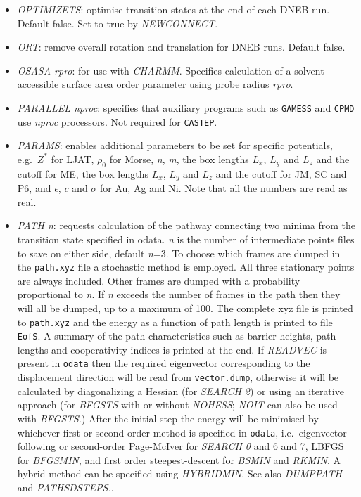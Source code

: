 \documentclass[12pt,a4paper,dvips]{article}
\begin{document}
\begin{itemize}
\item {\it OPTIMIZETS\/}: optimise transition states at the end of each DNEB run.
Default false. Set to true by {\it NEWCONNECT\/}.

\item {\it ORT\/}: remove overall rotation and translation for DNEB runs. Default false.

\item {\it OSASA rpro\/}: for use with {\it CHARMM\/}. Specifies calculation of
a solvent accessible surface area order parameter using probe radius {\it rpro\/}.

\item {\it PARALLEL nproc\/}: specifies that auxiliary programs such as {\tt GAMESS} and
{\tt CPMD} use {\it nproc\/} processors. Not required for {\tt CASTEP}.

\item {\it PARAMS\/}: enables additional parameters to be set for
specific potentials, e.g.~$Z^*$ for LJAT, $\rho_0$ for Morse, {\it n\/}, {\it m\/}, the
box lengths $L_x$, $L_y$ and $L_z$ and the cutoff for ME, the
box lengths $L_x$, $L_y$ and $L_z$ and the cutoff for JM, SC and P6,
and $\epsilon$, $c$ and $\sigma$ for Au, Ag and Ni. Note that all the
numbers are read as real.

\item {\it PATH n\/}: requests calculation of the pathway connecting two minima from the transition
state specified in odata. {\it n\/} is the number of intermediate points files to save on either
side, default {\it n\/}=3. 
To choose which frames are dumped in the {\tt path.xyz} file a stochastic method is employed.
All three stationary points are always included. 
Other frames are dumped with a probability proportional to {\it n\/}. 
If {\it n\/} exceeds the number of frames in the path then they will all be dumped, up to a 
maximum of 100.
The complete xyz file is printed to {\tt path.xyz} and the energy as a function of
path length is printed to file {\tt EofS}. A summary of the path characteristics such as barrier heights,
path lengths and cooperativity indices is printed at the end. If {\it READVEC\/} is present in
{\tt odata} then the required eigenvector corresponding to the displacement direction will
be read from {\tt vector.dump}, otherwise it will be calculated by diagonalizing a Hessian (for
{\it SEARCH 2\/}) or using an iterative approach (for {\it BFGSTS\/} with or without 
{\it NOHESS\/}; {\it NOIT\/} can also be used with {\it BFGSTS\/}.) 
After the initial step the energy will be minimised by whichever first or second
order method is specified in {\tt odata}, i.e.~eigenvector-following or second-order Page-McIver
for {\it SEARCH 0\/} and 6 and 7, LBFGS for {\it BFGSMIN\/}, and first order steepest-descent
for {\it BSMIN\/} and {\it RKMIN\/}. 
A hybrid method can be specified using {\it HYBRIDMIN\/}.
See also {\it DUMPPATH\/} and {\it PATHSDSTEPS\/.}.


\end{itemize}
\end{document}
